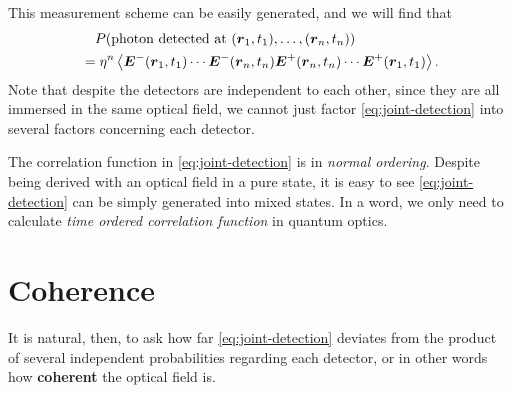 \documentclass[hyperref, a4paper]{article}
\newcommand*{\concept}[1]{{\textbf{#1}}}
\begin{document}
This measurement scheme can be easily generated, and we will find that 
\begin{equation}
    \begin{aligned}
        &\quad P(\text{photon detected at ($\vb*{r}_1, t_1), \ldots, (\vb*{r}_n$}, t_n)) \\
        &= \eta^n \expval{\vb*{E}^-(\vb*{r}_1, t_1) \cdots \vb*{E}^-(\vb*{r}_n, t_n) \vb*{E}^+(\vb*{r}_n, t_n) \cdots \vb*{E}^+(\vb*{r}_1, t_1)}.
    \end{aligned}
    \label{eq:joint-detection}
\end{equation}
Note that despite the detectors are independent to each other, since they are all immersed in the same optical field, we cannot just factor \eqref{eq:joint-detection} into several factors concerning each detector.

The correlation function in \eqref{eq:joint-detection} is in \emph{normal ordering}.
Despite being derived with an optical field in a pure state, it is easy to see \eqref{eq:joint-detection} can be simply generated into mixed states.
In a word, we only need to calculate \emph{time ordered correlation function} in quantum optics.

\section{Coherence}

It is natural, then, to ask how far \eqref{eq:joint-detection} deviates from the product of several independent probabilities regarding each detector, or in other words how \concept{coherent} the optical field is.
\end{document}
